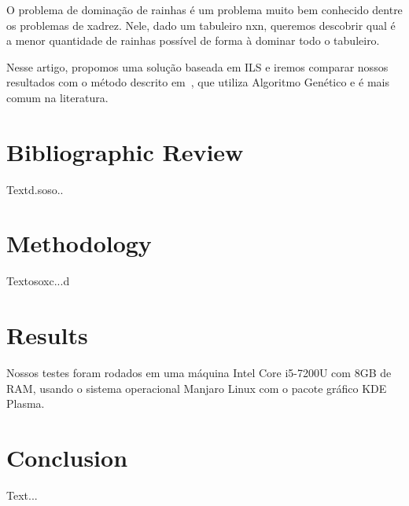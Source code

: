 \documentclass[sigconf]{acmart}
\begin{document}
O problema de dominação de rainhas é um problema muito bem conhecido
dentre os problemas de xadrez. Nele, dado um tabuleiro nxn, 
queremos descobrir qual é a menor quantidade de rainhas possível de forma
à dominar todo o tabuleiro.

Nesse artigo, propomos uma solução baseada em ILS e iremos comparar
nossos resultados com o método descrito em~\cite{SimoneBeauvoir}, 
que utiliza Algoritmo Genético e é mais comum na literatura.

\section{Bibliographic Review}

Textd.soso..

\section{Methodology}

Textosoxc...d

\section{Results}

Nossos testes foram rodados em uma máquina Intel Core i5-7200U com 8GB de RAM, usando o sistema operacional 
Manjaro Linux com o pacote gráfico KDE Plasma.

\section{Conclusion}

Text...



\end{document}
